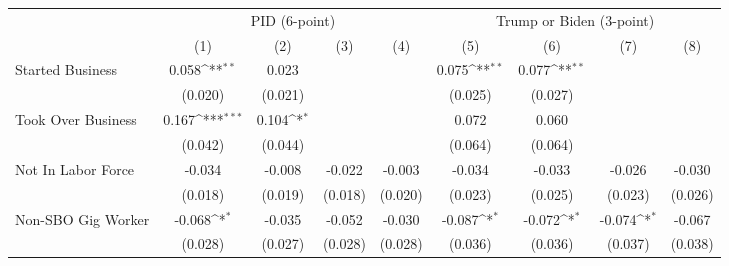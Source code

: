 {
\def\sym#1{\ifmmode^{#1}\else\(^{#1}\)\fi}
\begin{tabular}{l*{8}{c}}
\hline\hline
                    &\multicolumn{4}{c}{PID (6-point)}                                                      &\multicolumn{4}{c}{Trump or Biden (3-point)}                                           \\
                    &\multicolumn{1}{c}{(1)}         &\multicolumn{1}{c}{(2)}         &\multicolumn{1}{c}{(3)}         &\multicolumn{1}{c}{(4)}         &\multicolumn{1}{c}{(5)}         &\multicolumn{1}{c}{(6)}         &\multicolumn{1}{c}{(7)}         &\multicolumn{1}{c}{(8)}         \\
\hline
Started Business    &       0.058\sym{**} &       0.023         &                     &                     &       0.075\sym{**} &       0.077\sym{**} &                     &                     \\
                    &     (0.020)         &     (0.021)         &                     &                     &     (0.025)         &     (0.027)         &                     &                     \\
Took Over Business  &       0.167\sym{***}&       0.104\sym{*}  &                     &                     &       0.072         &       0.060         &                     &                     \\
                    &     (0.042)         &     (0.044)         &                     &                     &     (0.064)         &     (0.064)         &                     &                     \\
Not In Labor Force  &      -0.034         &      -0.008         &      -0.022         &      -0.003         &      -0.034         &      -0.033         &      -0.026         &      -0.030         \\
                    &     (0.018)         &     (0.019)         &     (0.018)         &     (0.020)         &     (0.023)         &     (0.025)         &     (0.023)         &     (0.026)         \\
Non-SBO Gig Worker  &      -0.068\sym{*}  &      -0.035         &      -0.052         &      -0.030         &      -0.087\sym{*}  &      -0.072\sym{*}  &      -0.074\sym{*}  &      -0.067         \\
                    &     (0.028)         &     (0.027)         &     (0.028)         &     (0.028)         &     (0.036)         &     (0.036)         &     (0.037)         &     (0.038)         \\

\end{tabular}}

